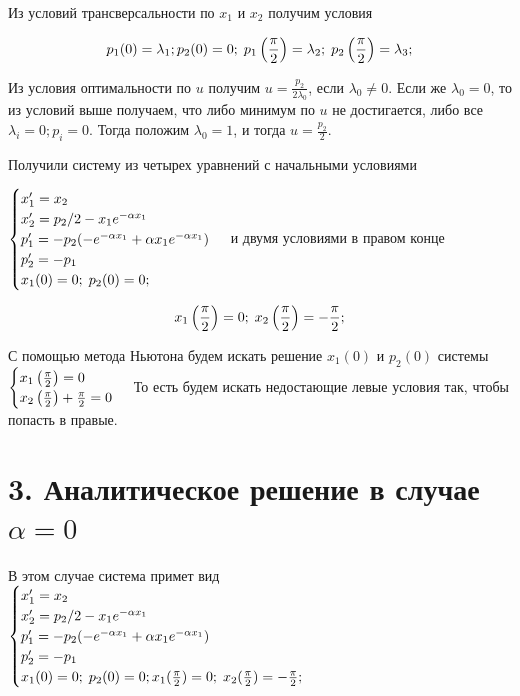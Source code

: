 \documentclass[titlepage]{article}
\def\l{\left}
\def\r{\right}
\begin{document}
Из условий трансверсальности по $x_1$ и $x_2$ получим условия

\begin{gather*}
	\notag p_1(0) = \lambda_1;  p_2(0) = 0; \; p_1\l(\frac{\pi}{2}\r) = \lambda_2; \;  p_2\l(\frac{\pi}{2}\r) = \lambda_3; \\
\end{gather*}

Из условия оптимальности по $u$ получим $u = \frac{p_2}{2 \lambda_0}$, если $\lambda_0 \neq 0$. Если же $\lambda_0 = 0$, то из условий выше получаем, что либо минимум по $u$ не достигается, либо все
$\lambda_i = 0; p_i = 0$. Тогда положим $\lambda_0 = 1$, и тогда $u = \frac{p_2}{2}$.

\bigbreak
Получили систему из четырех уравнений с  начальными условиями

\bigbreak
$\begin{cases} 
	\notag x_1' = x_2\\
	\notag x_2' = p_2/2 - x_1 e^{-\alpha x_1}\\
	\notag p_1' = -p_2 (-e^{-\alpha x_1} + \alpha x_1 e^{-\alpha x_1}) \\
	\notag p_2' = -p_1 \\
	\notag x_1(0) = 0; \; p_2(0) = 0;
\end{cases} $
\bigbreak
и двумя условиями в правом конце

\begin{gather*}
	\notag x_1\l(\frac{\pi}{2}\r) = 0; \; x_2\l(\frac{\pi}{2}\r) = -\frac{\pi}{2}; \\
\end{gather*}

С помощью метода Ньютона будем искать решение $x_1(0)$ и $p_2(0)$ системы
\bigbreak
$
\begin{cases}
	\notag x_1\l(\frac{\pi}{2}\r) = 0 \\
	\notag x_2\l(\frac{\pi}{2}\r) + \frac{\pi}{2} = 0 \\
\end{cases}
$
\bigbreak
То есть будем искать недостающие левые условия так, чтобы попасть в правые.

\section{3. Аналитическое решение в случае $\alpha = 0$}

В этом случае система примет вид
\bigbreak
$\begin{cases} 
	\notag x_1' = x_2\\
	\notag x_2' = p_2/2 - x_1 e^{-\alpha x_1}\\
	\notag p_1' = -p_2 (-e^{-\alpha x_1} + \alpha x_1 e^{-\alpha x_1}) \\
	\notag p_2' = -p_1 \\
	\notag x_1(0) = 0; \; p_2(0) = 0;
	\notag x_1(\frac{\pi}{2}) = 0; \; x_2(\frac{\pi}{2}) = -\frac{\pi}{2};
\end{cases} $
\bigbreak
\end{document}
